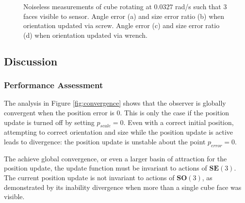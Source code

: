 \begin{figure}
{\begin{minipage}[b]{0.45\columnwidth}
 	\end{minipage}}
 	\caption{Noiseless measurements of cube rotating at $0.0327$ rad/s such that 3 faces visible to sensor. Angle error (a) and size error ratio (b) when orientation updated via screw. Angle error (c) and size error ratio (d) when orientation updated via wrench.}
 	\label{fig:orientation_size_rotating}
\end{figure}

\subsection{Discussion}
\subsubsection{Performance Assessment}
The analysis in Figure \ref{fig:convergence} shows that the observer is globally convergent when the position error is 0. This is only the case if the position update is turned off by setting $p_{scale} = 0$. Even with a correct initial position, attempting to correct orientation and size while the position update is active leads to divergence: the position update is unstable about the point $p_{error} = 0$. 

The achieve global convergence, or even a larger basin of attraction for the position update, the update function must be invariant to actions of $\mathbf{SE}(3)$. The current position update is not invariant to actions of $\mathbf{SO}(3)$, as demonstrated by its inability divergence when more than a single cube face was visible.


